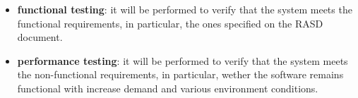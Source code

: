 \begin{itemize}
    \item \textbf{functional testing}: it will be performed to verify that the system meets the functional requirements, in particular, the ones specified on the RASD document.
    \item \textbf{performance testing}: it will be performed to verify that the system meets the non-functional requirements, in particular, wether the software remains functional with increase demand and various environment conditions.
\end{itemize}